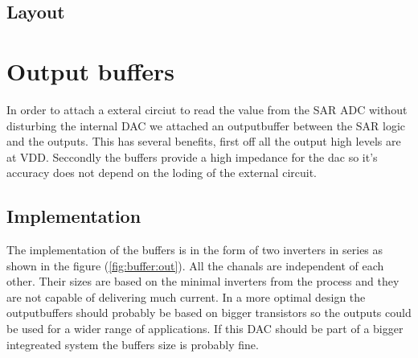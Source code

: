 \documentclass[english, 12pt, a4paper]{ifimaster}
\begin{document}
\subsection{Layout}




\section{Output buffers}
In order to attach a exteral circiut to read the value from the SAR ADC without disturbing the internal DAC we attached an outputbuffer between the SAR logic and the outputs.
This has several benefits, first off all the output high levels are at VDD. Seccondly the buffers provide a high impedance for the dac so it's accuracy does not depend on the loding of the external circuit.

\subsection{Implementation}
The implementation of the buffers is in the form of two inverters in series as shown in the figure (\ref{fig:buffer:out}). All the chanals are independent of each other. 
Their sizes are based on the minimal inverters from the process and they are not capable of delivering much current. 
In a more optimal design the outputbuffers should probably be based on bigger transistors so the outputs could be used for a wider range of applications. If this DAC should be part of a bigger integreated system
the buffers size is probably fine.
\end{document}
